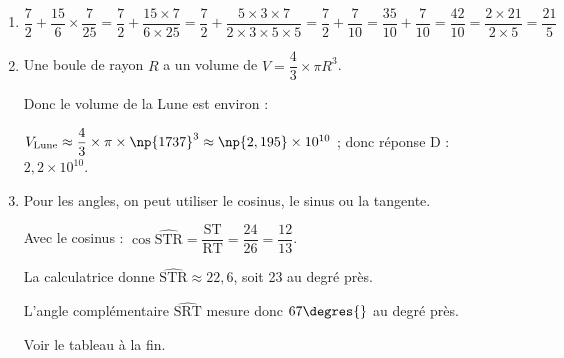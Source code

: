 \begin{enumerate}
\item %

$\dfrac{7}{2} + \dfrac{15}{6} \times \dfrac{7}{25} = \dfrac{7}{2} + \dfrac{15\times 7 }{6\times25} = 
 \dfrac{7}{2} + \dfrac{5 \times 3 \times 7 }{2 \times 3 \times 5\times 5} =  \dfrac{7}{2} + \dfrac{7}{10} = \dfrac{35}{10} + \dfrac{7}{10} = \dfrac{42}{10} = \dfrac{2 \times 21}{2 \times 5} = \dfrac{21}{5}$
		
		\item %
		
Une boule de rayon $R$ a un volume de $V = \dfrac{4}{3}\times \pi R^3$.

Donc le volume de la Lune est environ :

$V_{\text{Lune}} \approx \dfrac{4}{3}\times \pi \times \np{1737}^3 \approx \np{2,195} \times 10^{10}$ ; donc réponse D : $2,2 \times 10^{10}$.	
		
		\item %
Pour les angles, on peut utiliser le cosinus, le sinus ou la tangente.

Avec le cosinus : $\cos \widehat{\text{STR}} = \dfrac{\text{ST}}{\text{RT}} = \dfrac{24}{26} = \dfrac{12}{13}$.

La calculatrice donne $\widehat{\text{STR}} \approx 22,6$, soit 23\degres{} au degré près.

L'angle complémentaire $\widehat{\text{SRT}}$ mesure donc $67\degres{}$ au degré près.

Voir le tableau à la fin.
	\end{enumerate}

